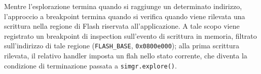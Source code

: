         Mentre l'esplorazione termina quando si raggiunge un determinato indirizzo, l'approccio a breakpoint termina quando si verifica quando viene rilevata una scrittura nella regione di Flash riservata all'applicazione. A tale scopo viene registrato un breakpoint di inspection sull'evento di scrittura in memoria, filtrato sull'indirizzo di tale regione (\texttt{FLASH\_BASE}, \texttt{0x0800e000}); alla prima scrittura rilevata, il relativo handler imposta un flah nello stato corrente, che diventa la condizione di terminazione passata a \texttt{simgr.explore()}.

